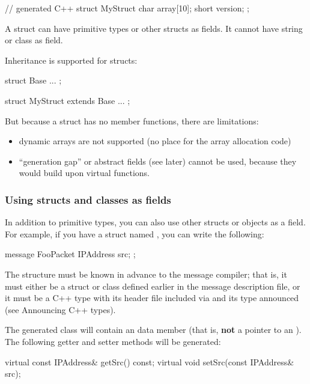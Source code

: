 \begin{cpp}
// generated C++
struct MyStruct
{
    char array[10];
    short version;
};
\end{cpp}

A struct can have primitive types or other structs as fields. It cannot
have string or class as field.

Inheritance is supported for structs:

\begin{msg}
struct Base
{
    ...
};

struct MyStruct extends Base
{
    ...
};
\end{msg}

But because a struct has no member functions, there are limitations:

\begin{itemize}
   \item dynamic arrays are not supported (no place for the array allocation code)
   \item ``generation gap'' or abstract fields (see later) cannot be used,
      because they would build upon virtual functions.
\end{itemize}


\subsubsection{Using structs and classes as fields}

In addition to primitive types, you can also use other structs or objects
as a field. For example, if you have a struct named ,
you can write the following:

\begin{msg}
message FooPacket
{
    IPAddress src;
};
\end{msg}

The  structure must be known in advance to the message compiler;
that is, it must either be a struct or class defined earlier in the message
description file, or it must be a C++ type with its header file
included via  and its type announced
(see Announcing C++ types).

The generated class will contain an  data member
(that is, \textbf{not} a pointer to an ).
The following getter and setter methods will be generated:

\begin{cpp}
virtual const IPAddress& getSrc() const;
virtual void setSrc(const IPAddress& src);
\end{cpp}


